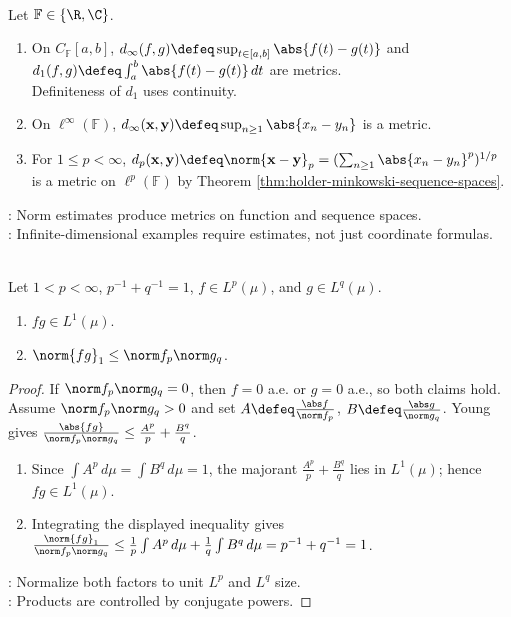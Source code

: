 \begin{example} \label{ex:function-and-sequence-metric-spaces} \\
Let $\mathbb{F}\in\{\R,\C\}$.
\begin{enumerate}[label=(\roman*)]
\setlength{\itemsep}{0pt}
\item On $C_{\mathbb{F}}[a,b]$, $d_\infty(f,g)\defeq\sup_{t\in[a,b]}\abs{f(t)-g(t)}$ and $d_1(f,g)\defeq\int_a^b\abs{f(t)-g(t)}\,dt$ are metrics.\\
Definiteness of $d_1$ uses continuity.
\item On $\ell^\infty(\mathbb{F})$, $d_\infty(\mathbf{x},\mathbf{y})\defeq\sup_{n\geq1}\abs{x_n-y_n}$ is a metric.
\item For $1\leq p<\infty$, $d_p(\mathbf{x},\mathbf{y})\defeq\norm{\mathbf{x}-\mathbf{y}}_p=(\sum_{n\geq1}\abs{x_n-y_n}^p)^{1/p}$ is a metric on $\ell^p(\mathbb{F})$ by Theorem \ref{thm:holder-minkowski-sequence-spaces}.
\end{enumerate}
: Norm estimates produce metrics on function and sequence spaces.\\
: Infinite-dimensional examples require estimates, not just coordinate formulas.
\end{example}

\begin{theorem} \label{thm:holder-inequality-lp} \\
Let $1<p<\infty$, $p^{-1}+q^{-1}=1$, $f\in L^p(\mu)$, and $g\in L^q(\mu)$.
\begin{enumerate}[label=(\roman*)]
\setlength{\itemsep}{0pt}
\item $fg\in L^1(\mu)$.
\item $\norm{fg}_1\leq\norm f_p\norm g_q$.
\end{enumerate}
\begin{proof} If $\norm f_p\norm g_q=0$, then $f=0$ a.e. or $g=0$ a.e., so both claims hold.\\
Assume $\norm f_p\norm g_q>0$ and set $A\defeq\frac{\abs f}{\norm f_p}$, $B\defeq\frac{\abs g}{\norm g_q}$. Young gives $\frac{\abs{fg}}{\norm f_p\norm g_q}\leq\frac{A^p}{p}+\frac{B^q}{q}$.
\begin{enumerate}[label=(\roman*)]
\setlength{\itemsep}{0pt}
\item Since $\int A^p\,d\mu=\int B^q\,d\mu=1$, the majorant $\frac{A^p}{p}+\frac{B^q}{q}$ lies in $L^1(\mu)$; hence $fg\in L^1(\mu)$.
\item Integrating the displayed inequality gives $\frac{\norm{fg}_1}{\norm f_p\norm g_q}\leq\frac{1}{p}\int A^p\,d\mu+\frac{1}{q}\int B^q\,d\mu=p^{-1}+q^{-1}=1$.
\end{enumerate}
: Normalize both factors to unit $L^p$ and $L^q$ size.\\
: Products are controlled by conjugate powers.
\end{proof}
\end{theorem}

